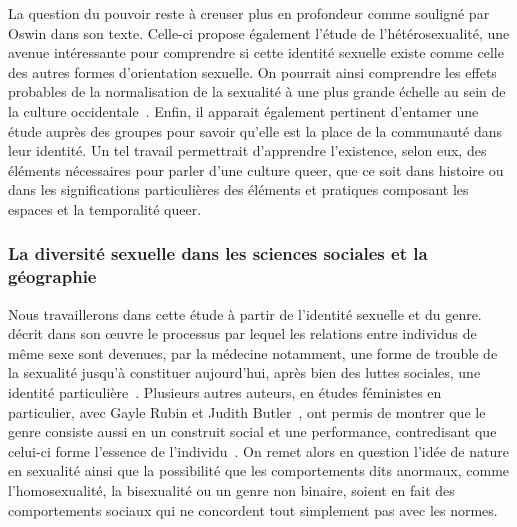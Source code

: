 La question du pouvoir reste à creuser plus en profondeur comme souligné par Oswin dans son texte.
Celle-ci propose également l'étude de l'hétérosexualité, une avenue intéressante pour comprendre si cette identité sexuelle existe comme celle des autres formes d'orientation sexuelle.
On pourrait ainsi comprendre les effets probables de la normalisation de la sexualité à une plus grande échelle au sein de la culture occidentale~\citep[100]{Oswin2008}.
Enfin, il apparait également pertinent d’entamer une étude auprès des groupes \lgbt{} pour savoir qu'elle est la place de la communauté dans leur identité.
Un tel travail permettrait d'apprendre l'existence, selon eux, des éléments nécessaires pour parler d'une culture queer, que ce soit dans histoire ou dans les significations particulières des éléments et pratiques composant les espaces et la temporalité queer.

\subsubsection{La diversité sexuelle dans les sciences sociales et la géographie}
\label{ssub:la_diversit_sexuelle_dans_les_sciences_sociales_et_la_g_ographie}
Nous travaillerons dans cette étude à partir de l'identité sexuelle et du genre.
\citet{Foucault2011} décrit dans son œuvre  le processus par lequel les relations entre individus de même sexe sont devenues, par la médecine notamment, une forme de trouble de la sexualité jusqu'à constituer aujourd'hui, après bien des luttes sociales, une identité particulière~\citep{Foucault2011}.
Plusieurs autres auteurs, en études féministes en particulier, avec Gayle Rubin et Judith Butler~\citep[98]{Marcus2005}, ont permis de montrer que le genre consiste aussi en un construit social et une performance, contredisant que celui-ci forme l'essence de l'individu~\citep{Butler2007}.
On remet alors en question l'idée de nature en sexualité ainsi que la possibilité que les comportements dits anormaux, comme l'homosexualité, la bisexualité ou un genre non binaire, soient en fait des comportements sociaux qui ne concordent tout simplement pas avec les normes.

